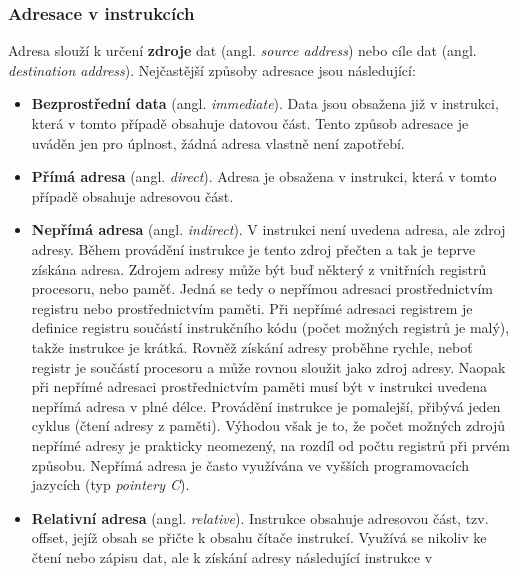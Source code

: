       \subsubsection{Adresace v instrukcích}
        Adresa slouží k určení \textbf{zdroje} dat (angl. \emph{source address}) nebo cíle dat 
        (angl. \emph{destination address}). Nejčastější způsoby adresace jsou následující:
        \begin{itemize}[noitemsep]
          \item \textbf{Bezprostřední data} (angl. \emph{immediate}). Data jsou obsažena již v  
                instrukci, která v tomto případě obsahuje datovou část. Tento způsob adresace je 
                uváděn jen pro úplnost, žádná adresa vlastně není zapotřebí.
          \item \textbf{Přímá adresa} (angl. \emph{direct}). Adresa je obsažena v instrukci, která  
                v tomto případě obsahuje adresovou část.
          \item \textbf{Nepřímá adresa} (angl. \emph{indirect}). V instrukci není uvedena adresa,  
                ale zdroj adresy. Během provádění instrukce je tento zdroj přečten a tak je teprve 
                získána adresa. Zdrojem adresy může být buď některý z vnitřních registrů procesoru, 
                nebo paměť. Jedná se tedy o nepřímou adresaci prostřednictvím registru nebo 
                prostřednictvím paměti. Při nepřímé adresaci registrem je definice registru 
                součástí instrukčního kódu (počet možných registrů je malý), takže instrukce je 
                krátká. Rovněž získání adresy proběhne rychle, neboť registr je součástí procesoru 
                a může rovnou sloužit jako zdroj adresy. Naopak při nepřímé adresaci                
                prostřednictvím paměti musí být v instrukci uvedena nepřímá adresa v plné délce. 
                Provádění instrukce je pomalejší, přibývá jeden cyklus (čtení adresy z paměti). 
                Výhodou však je to, že počet možných zdrojů nepřímé adresy je prakticky neomezený, 
                na rozdíl od počtu registrů při prvém způsobu. Nepřímá adresa je často využívána ve 
                vyšších programovacích jazycích (typ \emph{pointery C}).
          \item \textbf{Relativní adresa} (angl. \emph{relative}). Instrukce obsahuje adresovou  
                část, tzv. offset, jejíž obsah se přičte k obsahu čítače instrukcí. Využívá se 
                nikoliv ke čtení nebo zápisu dat, ale k získání adresy následující instrukce v 

\end{itemize}

